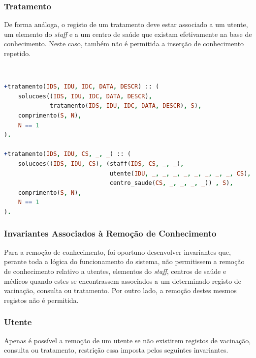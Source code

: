 \documentclass[a4paper, 11pt]{article}
\begin{document}
\subsubsection*{Tratamento}

De forma análoga, o registo de um tratamento deve estar associado a um utente, um elemento do \textit{staff} e a um centro
de saúde que existam efetivamente na base de conhecimento. Neste caso, também não é permitida a inserção de
conhecimento repetido.

\

\begin{lstlisting}[language=Prolog, caption={Invariantes de inserção relativos ao predicado \texttt{tratamento}}]
% Nao permite a insercao de registos duplicados
+tratamento(IDS, IDU, IDC, DATA, DESCR) :: (
    solucoes((IDS, IDU, IDC, DATA, DESCR),
             tratamento(IDS, IDU, IDC, DATA, DESCR), S),
    comprimento(S, N),
    N == 1
).

+tratamento(IDS, IDU, CS, _, _) :: (
    solucoes((IDS, IDU, CS), (staff(IDS, CS, _, _),
                              utente(IDU, _, _, _, _, _, _, _, _, CS),
                              centro_saude(CS, _, _, _, _)) , S),
    comprimento(S, N),
    N == 1
).
\end{lstlisting}

\subsubsection{Invariantes Associados à Remoção de Conhecimento}

Para a remoção de conhecimento, foi oportuno desenvolver invariantes que, perante toda a lógica do funcionamento do sistema,
não permitissem a remoção de conhecimento relativo a utentes, elementos do \textit{staff}, centros de saúde e médicos
quando estes se encontrassem associados a um determinado registo de vacinação, consulta ou tratamento. Por outro lado, a
remoção destes mesmos registos não é permitida.

\subsubsection*{Utente}

Apenas é possível a remoção de um utente se não existirem registos de vacinação, consulta ou tratamento, restrição essa
imposta pelos seguintes invariantes.

\
\end{document}
